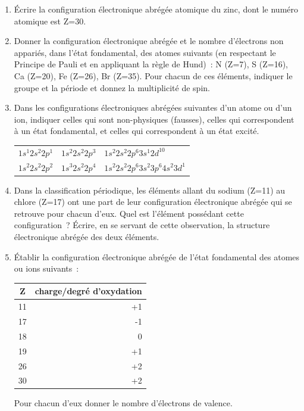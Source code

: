 \begin{enumerate}[\bf 1)]
\item \'Ecrire la configuration \'electronique abrégée atomique du zinc, dont le num\'ero 
atomique est Z=30.

\item Donner la configuration \'electronique abrégée et le nombre d'\'electrons non 
appari\'es, dans l'\'etat fondamental, des atomes suivants (en respectant le 
Principe de Pauli et en appliquant la r\`egle de Hund)~: N (Z=7), S (Z=16), 
Ca (Z=20), Fe (Z=26), Br (Z=35).
Pour chacun de ces éléments, indiquer le groupe et la période et donnez la multiplicité de spin.

\item Dans les configurations \'electroniques abrégées suivantes d'un atome ou d'un ion, 
indiquer celles qui sont non-physiques (fausses), celles qui correspondent 
\`a un \'etat fondamental, et celles qui correspondent \`a un \'etat excit\'e.

\begin{center}
\begin{tabular}{lll}
$1s^1 2s^2 2p^1$ & $1s^2 2s^2 2p^3$ & $1s^2 2s^2 2p^6 3s^1 2d^{10}$         \\
$1s^2 2s^2 2p^2$ & $1s^3 2s^2 2p^4$ & $1s^2 2s^2 2p^6 3s^2 3p^6 4s^2 3d^1$  \\
\end{tabular}
\end{center}

\item Dans la classification p\'eriodique, les \'el\'ements allant du sodium 
(Z=11) au chlore (Z=17) ont une part de leur configuration \'electronique abrégée qui 
se retrouve pour chacun d'eux. Quel est l'\'el\'ement poss\'edant cette 
configuration~?  \'Ecrire, en se servant de cette observation, la structure 
\'electronique abrégée des deux \'el\'ements.

\item \'Etablir la configuration \'electronique abrégée de l'\'etat fondamental 
des atomes ou ions suivants~:

\begin{center}
\begin{tabular}{c|r}\hline
Z & charge/degré d'oxydation \\\hline
11 & +1 \\\hline
17 & -1 \\\hline
18 & 0  \\\hline
19 & +1 \\\hline
26 & +2 \\\hline
30 & +2 \\\hline
\end{tabular}
\end{center}

Pour chacun d'eux donner le nombre d'\'electrons de valence.

\end{enumerate}
